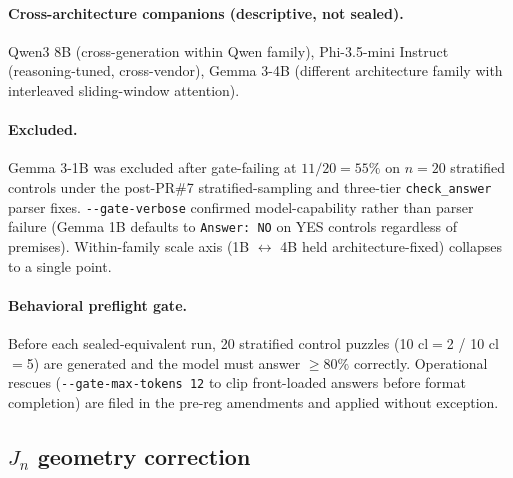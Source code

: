\documentclass[10pt, letterpaper]{article}
\newcommand{\Jn}{J_n}
\begin{document}
\paragraph{Cross-architecture companions (descriptive, not sealed).}
Qwen3 8B (cross-generation within Qwen family), Phi-3.5-mini Instruct
(reasoning-tuned, cross-vendor), Gemma 3-4B (different architecture
family with interleaved sliding-window attention).

\paragraph{Excluded.}
Gemma 3-1B was excluded after gate-failing at $11/20 = 55\%$ on $n=20$
stratified controls under the post-PR\#7 stratified-sampling and
three-tier \texttt{check\_answer} parser fixes. \texttt{-{}-gate-verbose}
confirmed model-capability rather than parser failure (Gemma 1B
defaults to \texttt{Answer: NO} on YES controls regardless of
premises). Within-family scale axis (1B $\leftrightarrow$ 4B held
architecture-fixed) collapses to a single point.

\paragraph{Behavioral preflight gate.}
Before each sealed-equivalent run, 20 stratified control puzzles (10
cl$=$2 / 10 cl$=$5) are generated and the model must answer $\geq 80\%$
correctly. Operational rescues (\texttt{-{}-gate-max-tokens 12} to clip
front-loaded answers before format completion) are filed in the
pre-reg amendments and applied without exception.

\subsection{$\Jn$ geometry correction}
\label{sec:methods:jn}
\end{document}
